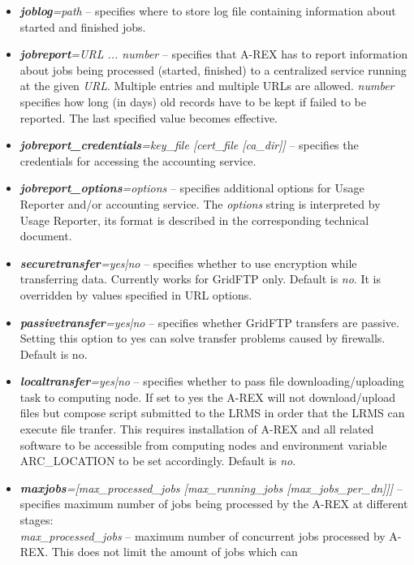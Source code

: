 \documentclass{article}                            %
\begin{document}
\begin{itemize}
\item \textbf{\textit{joblog}}\textit{=path} -- specifies where to store
log file containing information about started and finished jobs.
\item \textbf{\textit{jobreport}}\textit{=URL ... number} -- specifies
that A-REX has to report information about jobs being processed (started,
finished) to a centralized service running at the given \textit{URL}. Multiple
entries and multiple URLs are allowed. \textit{number} specifies how
long (in days) old records have to be kept if failed to be
reported. The last specified value becomes effective.
\item \textbf{\textit{jobreport\_credentials}}\textit{=key\_file
    {[}cert\_file {[}ca\_dir]]} -- specifies the credentials for
  accessing the accounting service.
\item \textbf{\textit{jobreport\_options}}\textit{=options}
  -- specifies additional options for Usage Reporter and/or
  accounting service. The \textit{options} string is interpreted by Usage
  Reporter, its format is described in the corresponding technical document.
\item \textbf{\textit{securetransfer}}\textit{=yes|no} -- specifies whether
to use encryption while transferring data. Currently works for GridFTP
only. Default is \emph{no}. It is overridden by values specified in
URL options.
\item \textbf{\textit{passivetransfer}}\textit{=yes|no} -- specifies
  whether GridFTP transfers are passive. Setting this option to yes
  can solve transfer problems caused by firewalls. Default is no.
\item \textbf{\textit{localtransfer}}\textit{=yes|no} -- specifies whether
to pass file downloading/uploading task to computing node. If set
to yes the A-REX will not download/upload files but compose script
submitted to the LRMS in order that the LRMS can execute file tranfer. This
requires installation of A-REX and all related software to be accessible
from computing nodes and environment variable ARC\_LOCATION to be
set accordingly. Default is \emph{no}.
\item \textbf{\textit{maxjobs}}\textit{={[}max\_processed\_jobs
{[}max\_running\_jobs {[}max\_jobs\_per\_dn]]]} -- specifies maximum number of
jobs being processed by the A-REX at different stages:\\
\textit{max\_processed\_jobs} -- maximum number of concurrent jobs
processed by A-REX. This does not limit the amount of jobs which can

\end{itemize}
\end{document}
